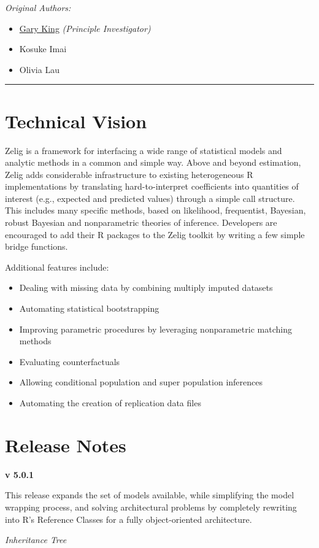 \documentclass[letterpaper,10pt,english]{sphinxmanual}
\begin{document}
\emph{Original Authors:}
\begin{itemize}
\item {} 
\href{http://gking.harvard.edu/}{Gary King} \emph{(Principle Investigator)}

\item {} 
Kosuke Imai

\item {} 
Olivia Lau

\end{itemize}


\bigskip\hrule{}\bigskip



\section{Technical Vision}
\label{about:technical-vision}
Zelig is a framework for interfacing a wide range of statistical models and analytic methods in a common and simple way. Above and beyond estimation, Zelig adds considerable infrastructure to existing heterogeneous R implementations by translating hard-to-interpret coefficients into quantities of interest (e.g., expected and predicted values) through a simple call structure. This includes many specific methods, based on likelihood, frequentist, Bayesian, robust Bayesian and nonparametric theories of inference. Developers are encouraged to add their R packages to the Zelig toolkit by writing a few simple bridge functions.

Additional features include:
\begin{itemize}
\item {} 
Dealing with missing data by combining multiply imputed datasets

\item {} 
Automating statistical bootstrapping

\item {} 
Improving parametric procedures by leveraging nonparametric matching methods

\item {} 
Evaluating counterfactuals

\item {} 
Allowing conditional population and super population inferences

\item {} 
Automating the creation of replication data files

\end{itemize}


\section{Release Notes}
\label{about:release-notes}
\textbf{v 5.0.1}

This release expands the set of models available, while simplifying the model wrapping process, and solving architectural problems by completely rewriting into R’s Reference Classes for a fully object-oriented architecture.

\emph{Inheritance Tree}



\renewcommand{\indexname}{Index}
\printindex
\end{document}
